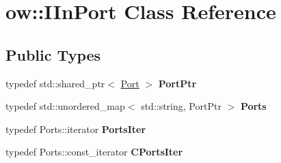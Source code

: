 \hypertarget{classow_1_1IInPort}{}\section{ow\+:\+:I\+In\+Port Class Reference}
\label{classow_1_1IInPort}
\subsection*{Public Types}
\begin{DoxyCompactItemize}
\item 
typedef std\+::shared\+\_\+ptr$<$ \hyperlink{classow_1_1Port}{Port} $>$ {\bfseries Port\+Ptr}\hypertarget{classow_1_1IInPort_ab5ca8cd913fe6a92016552c8ec2f623d}{}\label{classow_1_1IInPort_ab5ca8cd913fe6a92016552c8ec2f623d}

\item 
typedef std\+::unordered\+\_\+map$<$ std\+::string, Port\+Ptr $>$ {\bfseries Ports}\hypertarget{classow_1_1IInPort_a1584bfe1f59cf2df30b3937bd1dd3ea9}{}\label{classow_1_1IInPort_a1584bfe1f59cf2df30b3937bd1dd3ea9}

\item 
typedef Ports\+::iterator {\bfseries Ports\+Iter}\hypertarget{classow_1_1IInPort_a9abb35d35a920b71fa03729471331e80}{}\label{classow_1_1IInPort_a9abb35d35a920b71fa03729471331e80}

\item 
typedef Ports\+::const\+\_\+iterator {\bfseries C\+Ports\+Iter}\hypertarget{classow_1_1IInPort_afccf1ba64c6207d903afe0c2b4a8e657}{}\label{classow_1_1IInPort_afccf1ba64c6207d903afe0c2b4a8e657}

\end{DoxyCompactItemize}
